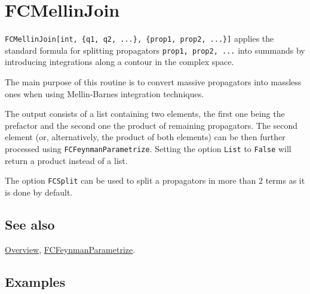 \documentclass[../FeynCalcManual.tex]{subfiles}
\begin{document}
\begin{Shaded}
\begin{Highlighting}[]
 
\end{Highlighting}
\end{Shaded}

\hypertarget{fcmellinjoin}{
\section{FCMellinJoin}\label{fcmellinjoin}}

\texttt{FCMellinJoin[\allowbreak{}int,\ \allowbreak{}\{\allowbreak{}q1,\ \allowbreak{}q2,\ \allowbreak{}...\},\ \allowbreak{}\{\allowbreak{}prop1,\ \allowbreak{}prop2,\ \allowbreak{}...\}]}
applies the standard formula for splitting propagators
\texttt{prop1,\ \allowbreak{}prop2,\ \allowbreak{}...} into summands by
introducing integrations along a contour in the complex space.

The main purpose of this routine is to convert massive propagators into
massless ones when using Mellin-Barnes integration techniques.

The output consists of a list containing two elements, the first one
being the prefactor and the second one the product of remaining
propagators. The second element (or, alternatively, the product of both
elements) can be then further processed using
\texttt{FCFeynmanParametrize}. Setting the option \texttt{List} to
\texttt{False} will return a product instead of a list.

The option \texttt{FCSplit} can be used to split a propagators in more
than 2 terms as it is done by default.

\subsection{See also}

\hyperlink{toc}{Overview},
\hyperlink{fcfeynmanparametrize}{FCFeynmanParametrize}.

\subsection{Examples}
\end{document}
